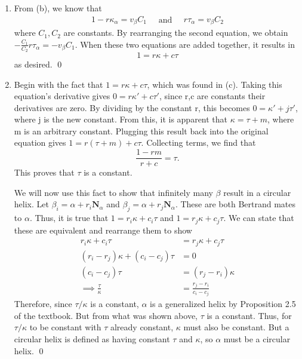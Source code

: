 \documentclass{article}
\begin{document}
\begin{enumerate}
\begin{enumerate}
\item From (b), we know that
\begin{equation*}
\begin{split}
1 - r\kappa_{\alpha} = v_{\beta}C_1
\end{split}
\quad \textrm{and} \quad
\begin{split}
r\tau_{\alpha} = v_{\beta}C_2
\end{split}
\end{equation*}
where $C_1,C_2$ are constants.
By rearranging the second equation, we obtain $-\frac{C_1}{C_2}r\tau_{\alpha} = -v_{\beta}C_1$.
When these two equations are added together, it results in 
\begin{equation*}
1 = r\kappa + c\tau
\end{equation*}
as desired. \qed

\item Begin with the fact that $1 = r\kappa + c\tau$, which was found in (c).
Taking this equation's derivative gives $0 = r\kappa'+c\tau'$, since r,c are constants their derivatives are zero.
By dividing by the constant r, this becomes $0 = \kappa' + j\tau'$, where j is the new constant.
From this, it is apparent that $\kappa = \tau + m$, where m is an arbitrary constant.
Plugging this result back into the original equation gives $1 = r(\tau + m) + c\tau$. 
Collecting terms, we find that 
\begin{equation*}
\frac{1-rm}{r+c} = \tau.
\end{equation*}
This proves that $\tau$ is a constant. 

We will now use this fact to show that infinitely many $\beta$ result in a circular helix.
Let $\beta_i = \alpha + r_i\mathbf{N}_{\alpha}$ and $\beta_j = \alpha + r_j\mathbf{N}_{\alpha}$.
These are both Bertrand mates to $\alpha$. 
Thus, it is true that $1 = r_i\kappa+c_i\tau$ and $1 = r_j\kappa+c_j\tau$.
We can state that these are equivalent and rearrange them to show
\begin{align*}
r_i\kappa+c_i\tau &= r_j\kappa+c_j\tau\\
(r_i-r_j)\kappa + (c_i-c_j)\tau &= 0\\
(c_i-c_j)\tau &= (r_j-r_i)\kappa\\
\implies \frac{\tau}{\kappa} &= \frac{r_j-r_i}{c_i-c_j}
\end{align*}
Therefore, since $\tau/\kappa$ is a constant, $\alpha$ is a generalized helix by Proposition 2.5 of the textbook.
But from what was shown above, $\tau$ is a constant. 
Thus, for $\tau/\kappa$ to be constant with $\tau$ already constant, $\kappa$ must also be constant.
But a circular helix is defined as having constant $\tau$ and $\kappa$, so $\alpha$ must be a circular helix.
\qed


\end{enumerate}
\end{enumerate}
\end{document}
